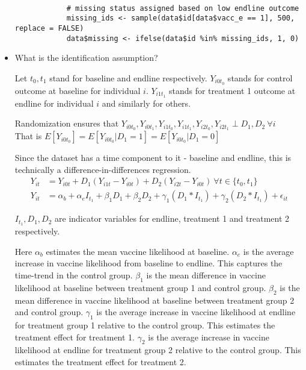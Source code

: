 \documentclass[11pt]{article}
\begin{document}
\begin{itemize}
\begin{verbatim}
			
			# missing status assigned based on low endline outcome
			missing_ids <- sample(data$id[data$vacc_e == 1], 500, replace = FALSE)
			data$missing <- ifelse(data$id %in% missing_ids, 1, 0)
		\end{verbatim}
		
		\item 
		
		What is the identification assumption?
		
		Let \( t_0, t_1\) stand for baseline and endline respectively. \(Y_{i0t_0}\) stands for control outcome at baseline for individual \( i \). \(Y_{i1t_1}\) stands for treatment 1 outcome at endline for individual \( i \) and similarly for others.
		
		Randomization ensures that \( Y_{i0t_0}, Y_{i0t_1}, Y_{i1t_0}, Y_{i1t_1}, Y_{i2t_0}, Y_{i2t_1} \perp D_1, D_2 \ \forall i \)  \\
		That is \( E[Y_{i0t_0}] = E[Y_{i0t_0}| D_1 = 1] = E[Y_{i0t_0} | D_1 = 0 ]   \)
		
		Since the dataset has a time component to it - baseline and endline, this is technically a difference-in-differences regression. 
		\begin{align*}
			Y_{it} &= Y_{i0t} + D_1(Y_{i1t}- Y_{i0t})+ D_2(Y_{i2t}- Y_{i0t}) \ \forall t \in \{ t_0, t_1 \}\\
			Y_{it} &= \alpha_b + \alpha_e I_{t_1} + \beta_1 D_1 + \beta_2 D_2 + \gamma_1 (D_1*I_{t_1}) + \gamma_2 (D_2*I_{t_1}) + \epsilon_{it}  
		\end{align*}
		
		\( I_{t_1}, D_1, D_2 \) are indicator variables for endline, treatment 1 and treatment 2 respectively.

		Here \( \alpha_b \) estimates the mean vaccine likelihood at baseline. \( \alpha_e \) is the average increase in vaccine likelihood from baseline to endline. This captures the time-trend in the control group. \( \beta_1 \) is the mean difference in vaccine likelihood at baseline between treatment group 1 and control group. \( \beta_2 \) is the mean difference in vaccine likelihood at baseline between treatment group 2 and control group.  \( \gamma_1 \) is the average increase in vaccine likelihood at endline for treatment group 1 relative to the control group. This estimates the treatment effect for treatment 1. \( \gamma_2 \) is the average increase in vaccine likelihood at endline for treatment group 2 relative to the control group. This estimates the treatment effect for treatment 2.
		

\end{itemize}
\end{document}
